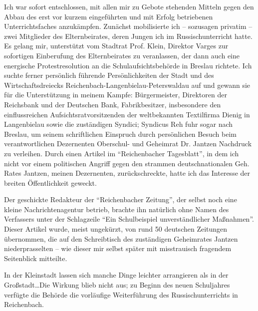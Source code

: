 \documentclass[a5paper,pagesize,10pt,twoside=true]{scrbook}
\begin{document}
Ich war sofort entschlossen, mit allen mir zu Gebote stehenden Mitteln gegen den Abbau des erst vor kurzem eingeführten und mit Erfolg betriebenen Unterrichtsfaches anzukämpfen. Zunächst mobilisierte ich -- sozusagen privatim -- zwei Mitglieder des Elternbeirates, deren Jungen ich im Russischunterricht hatte. Es gelang mir, unterstützt vom Stadtrat Prof. Klein, Direktor Varges zur sofortigen Einberufung des Elternbeirates zu veranlassen, der dann auch eine energische Protestresolution an die Schulaufsichtsbehörde in Breslau richtete. Ich suchte ferner persönlich führende Persönlichkeiten der Stadt und des Wirtschaftsdreiecks Reichenbach-Langenbielau-Peterswaldau auf und gewann sie für die Unterstützung in meinem Kampfe: Bürgermeister, Direktoren der Reichsbank und der Deutschen Bank, Fabrikbesitzer, insbesondere den einflussreichen Aufsichtsratvorsitzenden der weltbekannten Textilfirma Dienig in Langenbielau sowie die zuständigen Syndici; Syndicus Reh fuhr sogar nach Breslau, um seinem schriftlichen Einspruch durch persönlichen Besuch beim verantwortlichen Dezernenten Oberschul- und Geheimrat Dr. Jantzen Nachdruck zu verleihen. Durch einen Artikel im \enquote{Reichenbacher Tagesblatt}, in dem ich nicht vor einem politischen Angriff gegen den strammen deutschnationalen Geh. Rates Jantzen, meinen Dezernenten, zurückschreckte, hatte ich das Interesse der breiten Öffentlichkeit geweckt.

Der geschickte Redakteur der \enquote{Reichenbacher Zeitung}, der selbst noch eine kleine Nachrichtenagentur betrieb, brachte ihn natürlich ohne Namen des Verfassers unter der Schlagzeile \enquote{Ein Schulbeispiel unverständlicher Maßnahmen}. Dieser Artikel wurde, meist ungekürzt, von rund 50 deutschen Zeitungen übernommen, die auf den Schreibtisch des zuständigen Geheimrates Jantzen niederprasselten -- wie dieser mir selbst später mit misstrauisch fragendem Seitenblick mitteilte.

In der Kleinstadt lassen sich manche Dinge leichter arrangieren als in der Großstadt\dots Die Wirkung blieb nicht aus; zu Beginn des neuen Schuljahres verfügte die Behörde die vorläufige Weiterführung des Russischunterrichts in Reichenbach.
\end{document}
